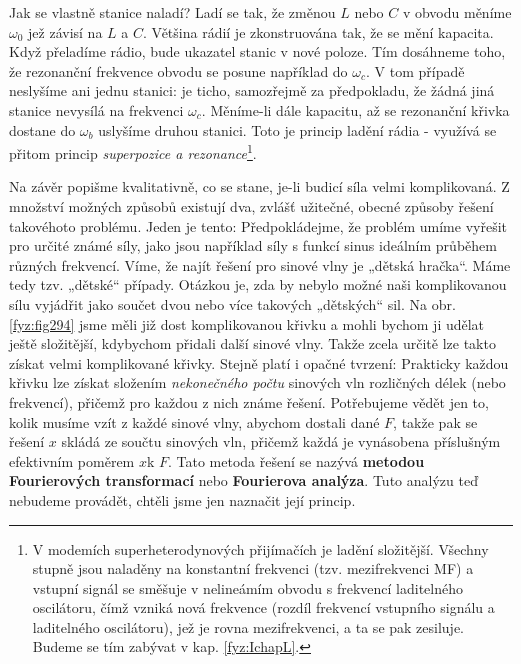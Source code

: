 {    Jak se vlastně stanice naladí? Ladí se tak, že změnou \(L\) nebo \(C\) v obvodu měníme 
    \(\omega_0\) jež závisí na \(L\) a \(C\). Většina rádií je zkonstruována tak, že se mění 
    kapacita. Když přeladíme rádio, bude ukazatel stanic v nové poloze. Tím dosáhneme toho, že 
    rezonanční frekvence obvodu se posune například do \(\omega_c\). V tom případě neslyšíme ani 
    jednu stanici: je ticho, samozřejmě za předpokladu, že žádná jiná stanice nevysílá na frekvenci 
    \(\omega_c\). Měníme-li dále kapacitu, až se rezonanční křivka dostane do \(\omega_b\) uslyšíme 
    druhou stanici. Toto je princip ladění rádia - využívá se přitom princip \emph{superpozice a 
    rezonance}\footnote{V modemích superheterodynových přijímačích je ladění složitější. Všechny 
    stupně jsou naladěny na konstantní frekvenci (tzv. mezifrekvenci MF) a vstupní signál se 
    směšuje v nelineámím obvodu s frekvencí laditelného oscilátoru, čímž vzniká nová frekvence 
    (rozdíl frekvencí vstupního signálu a laditelného oscilátoru), jež je rovna mezifrekvenci, a ta 
    se pak zesiluje. Budeme se tím zabývat v kap. \ref{fyz:IchapL}.}.
    
    Na závěr popišme kvalitativně, co se stane, je-li budicí síla velmi komplikovaná. Z množství 
    možných způsobů existují dva, zvlášť užitečné, obecné způsoby řešení takovéhoto problému. Jeden 
    je tento: Předpokládejme, že problém umíme vyřešit pro určité známé síly, jako jsou například 
    síly s funkcí sinus ideálním průběhem různých frekvencí. Víme, že najít řešení pro sinové vlny 
    je „dětská hračka“. Máme tedy tzv. „dětské“ případy. Otázkou je, zda by nebylo možné naši 
    komplikovanou sílu vyjádřit jako součet dvou nebo více takových „dětských“ sil. Na obr. 
    \ref{fyz:fig294} jsme měli již dost komplikovanou křivku a mohli bychom ji udělat ještě 
    složitější, kdybychom přidali další sinové vlny. Takže zcela určitě lze takto získat velmi 
    komplikované křivky. Stejně platí i opačné tvrzení: Prakticky každou křivku lze získat složením 
    \emph{nekonečného počtu} sinových vln rozličných délek (nebo frekvencí), přičemž pro každou z 
    nich známe řešení. Potřebujeme vědět jen to, kolik musíme vzít z každé sinové vlny, abychom 
    dostali dané \(F\), takže pak se řešení \(x\) skládá ze součtu sinových vln, přičemž každá je 
    vynásobena příslušným efektivním poměrem \(x\)k  \(F\). Tato metoda řešení se nazývá 
    \textbf{metodou Fourierových transformací} nebo \textbf{Fourierova analýza}. Tuto analýzu teď 
    nebudeme provádět, chtěli jsme jen naznačit její princip.
    
}
